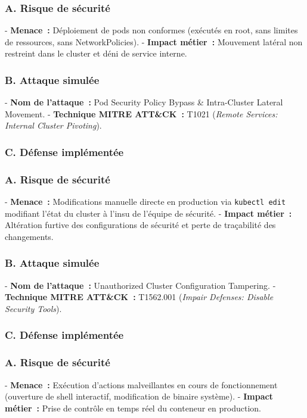 \vspace{0.3cm}
\subsubsection{A. Risque de sécurité}
- \textbf{Menace~:} Déploiement de pods non conformes (exécutés en root, sans limites de ressources, sans NetworkPolicies).
- \textbf{Impact métier~:} Mouvement latéral non restreint dans le cluster et déni de service interne.

\subsubsection{B. Attaque simulée}
- \textbf{Nom de l'attaque~:} Pod Security Policy Bypass \& Intra-Cluster Lateral Movement.
- \textbf{Technique MITRE ATT\&CK~:} T1021 (\textit{Remote Services: Internal Cluster Pivoting}).

\subsubsection{C. Défense implémentée}

\vspace{0.3cm}
\subsubsection{A. Risque de sécurité}
- \textbf{Menace~:} Modifications manuelle directe en production via \texttt{kubectl edit} modifiant l'état du cluster à l'insu de l'équipe de sécurité.
- \textbf{Impact métier~:} Altération furtive des configurations de sécurité et perte de traçabilité des changements.

\subsubsection{B. Attaque simulée}
- \textbf{Nom de l'attaque~:} Unauthorized Cluster Configuration Tampering.
- \textbf{Technique MITRE ATT\&CK~:} T1562.001 (\textit{Impair Defenses: Disable Security Tools}).

\subsubsection{C. Défense implémentée}

\vspace{0.3cm}
\subsubsection{A. Risque de sécurité}
- \textbf{Menace~:} Exécution d'actions malveillantes en cours de fonctionnement (ouverture de shell interactif, modification de binaire système).
- \textbf{Impact métier~:} Prise de contrôle en temps réel du conteneur en production.

